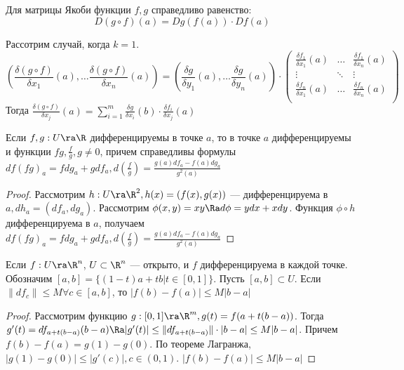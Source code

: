 \begin{corollary}
    Для матрицы Якоби функции \(f, g\) справедливо равенство:
    \[D(g \circ f)(a) = Dg(f(a)) \cdot Df(a)\]
\end{corollary}

Рассотрим случай, когда \(k = 1\).
\[\left(\frac{\delta (g \circ f)}{\delta x_1}(a), \dots \frac{\delta (g \circ f)}{\delta x_n}(a)\right) = \left(\frac{\delta g}{\delta y_1}(a), \dots \frac{\delta g}{\delta y_n}(a)\right)\cdot\left(\begin{array}{ccc}
    \frac{\delta f_1}{\delta x_1}(a) & \dots & \frac{\delta f_1}{\delta x_n}(a) \\ 
    \vdots & \ddots & \vdots \\ 
    \frac{\delta f_n}{\delta x_1}(a) & \dots & \frac{\delta f_n}{\delta x_n}(a) \\ 
\end{array}\right)\]
Тогда \(\frac{\delta (g \circ f)}{\delta x_j}(a) = \sum_{i = 1}^m \frac{\delta g}{\delta x_i} (b) \cdot \frac{\delta f_i}{\delta x_j}(a)\)

\begin{corollary}
    Если \(f, g: U \ra \R\) дифференцируемы в точке \(a\), то в точке \(a\) дифференцируемы и функции \(fg, \frac{f}{g}, g \ne 0\), причем справедливы формулы \(df(fg)_a = fdg_a + gdf_a, d\left(\frac{f}{g}\right) = \frac{g(a)df_a - f(a)dg_a}{g^2(a)}\)
\end{corollary}
\begin{proof}
    Рассмотрим \(h: U \ra \R^2, h(x) = (f(x), g(x))\) --- дифференцируема в \(a, dh_a = (df_a, dg_a)\). Рассмотрим \(\phi(x, y) = xy \Ra d\phi = ydx + xdy\). Функция \(\phi \circ h\) дифференцируема в \(a\), получаем \(df(fg)_a = fdg_a + gdf_a, d\left(\frac{f}{g}\right) = \frac{g(a)df_a - f(a)dg_a}{g^2(a)}\)
\end{proof}

\begin{theorem}
    Если \(f: U \ra \R^n\), \(U \subset \R^n\) --- открыто, и \(f\) дифференцируема в каждой точке. Обозначим \([a, b] = \{(1 - t)a + tb | t \in [0, 1]\}\). Пусть \([a, b] \subset U\). Если \(\|df_c\| \le M \forall c \in [a, b]\), то \(|f(b) - f(a)| \le M|b - a|\)
\end{theorem}
\begin{proof}
    Рассмотрим функцию \(g: [0, 1] \ra \R^m, g(t) = f(a + t(b - a))\). Тогда \(g'(t) = df_{a + t(b - a)}(b - a) \Ra |g'(t)| \le \|df_{a + t(b - a)}\|\cdot|b - a| \le M|b - a|\). Причем \(f(b) - f(a) = g(1) - g(0)\). По теореме Лагранжа, \(|g(1) - g(0)| \le |g'(c)|, c \in (0, 1)\). \(|f(b) - f(a)| \le M|b - a|\)
\end{proof}

